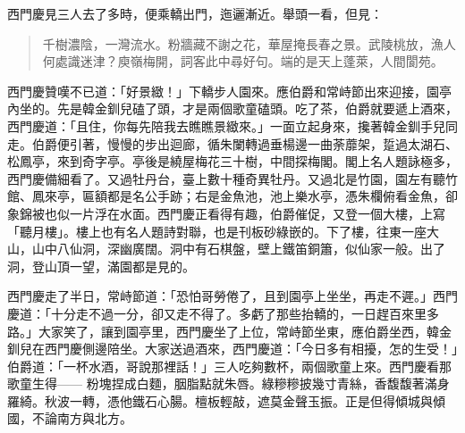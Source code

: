 西門慶見三人去了多時，便乘轎出門，迤邐漸近。舉頭一看，但見：
\begin{quote}
千樹濃陰，一灣流水。粉牆藏不謝之花，華屋掩長春之景。武陵桃放，漁人何處識迷津？庾嶺梅開，詞客此中尋好句。端的是天上蓬萊，人間閬苑。
\end{quote}

西門慶贊嘆不已道：「好景緻！」下轎步人園來。應伯爵和常峙節出來迎接，園亭內坐的。先是韓金釧兒磕了頭，才是兩個歌童磕頭。吃了茶，伯爵就要遞上酒來，西門慶道：「且住，你每先陪我去瞧瞧景緻來。」一面立起身來，攙著韓金釧手兒同走。伯爵便引著，慢慢的步出迴廊，循朱闌轉過垂楊邊一曲荼蘼架，踅過太湖石、松鳳亭，來到奇字亭。亭後是繞屋梅花三十樹，中間探梅閣。閣上名人題詠極多，西門慶備細看了。又過牡丹台，臺上數十種奇異牡丹。又過北是竹園，園左有聽竹館、鳳來亭，匾額都是名公手跡；右是金魚池，池上樂水亭，憑朱欄俯看金魚，卻象錦被也似一片浮在水面。西門慶正看得有趣，伯爵催促，又登一個大樓，上寫「聽月樓」。樓上也有名人題詩對聯，也是刊板砂綠嵌的。下了樓，往東一座大山，山中八仙洞，深幽廣闊。洞中有石棋盤，壁上鐵笛銅簫，似仙家一般。出了洞，登山頂一望，滿園都是見的。

西門慶走了半日，常峙節道：「恐怕哥勞倦了，且到園亭上坐坐，再走不遲。」西門慶道：「十分走不過一分，卻又走不得了。多虧了那些抬轎的，一日趕百來里多路。」大家笑了，讓到園亭里，西門慶坐了上位，常峙節坐東，應伯爵坐西，韓金釧兒在西門慶側邊陪坐。大家送過酒來，西門慶道：「今日多有相擾，怎的生受！」伯爵道：「一杯水酒，哥說那裡話！」三人吃夠數杯，兩個歌童上來。西門慶看那歌童生得——
粉塊捏成白麵，胭脂點就朱唇。綠糝糝披幾寸青絲，香馥馥著滿身羅綺。秋波一轉，憑他鐵石心腸。檀板輕敲，遮莫金聲玉振。正是但得傾城與傾國，不論南方與北方。

